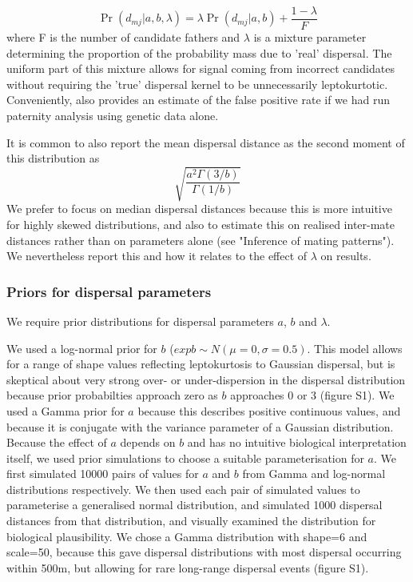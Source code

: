 \documentclass[10pt, a4paper, twocolumn]{article} %
\begin{document}
\begin{equation}\label{eqn:mixture_model}
\Pr(d_{mj} | a,b,\lambda) = \lambda \Pr(d_{mj}|a,b) + \frac{1-\lambda}{F}
\end{equation}
where F is the number of candidate fathers and $\lambda$ is a mixture parameter determining the proportion of the probability mass due to ’real’ dispersal. The uniform part of this mixture allows for signal coming from incorrect candidates without requiring the 'true' dispersal kernel to be unnecessarily leptokurtotic. Conveniently, also provides an estimate of the false positive rate if we had run paternity analysis using genetic data alone.

It is common to also report the mean dispersal distance as the second moment of this distribution as
\begin{equation}
\label{eqn:sd_GND}    
\sqrt{ \frac{ a^2 \Gamma(3/b) }{ \Gamma(1/b) } }
\end{equation}
We prefer to focus on median dispersal distances because this is more intuitive for highly skewed distributions, and also to estimate this on realised inter-mate distances rather than on parameters alone (see "Inference of mating patterns"). We nevertheless report this and how it relates to the effect of $\lambda$ on results.

\subsubsection{Priors for dispersal parameters}

We require prior distributions for dispersal parameters $a$, $b$ and $\lambda$.

We used a log-normal prior for $b$ ($exp{b} \sim N(\mu=0, \sigma = 0.5)$.
This model allows for a range of shape values reflecting leptokurtosis to Gaussian dispersal, but is skeptical about very strong over- or under-dispersion in the dispersal distribution because prior probabilties approach zero as $b$ approaches 0 or 3 (figure S1).
We used a Gamma prior for $a$ because this describes positive continuous values, and because it is conjugate with the variance parameter of a Gaussian distribution.
Because the effect of $a$ depends on $b$ and has no intuitive biological interpretation itself, we used prior simulations to choose a suitable parameterisation for $a$. We first simulated 10000 pairs of values for $a$ and $b$ from Gamma and log-normal distributions respectively. We then used each pair of simulated values to parameterise a generalised normal distribution, and simulated 1000 dispersal distances from that distribution, and visually examined the distribution for biological plausibility. We chose a Gamma distribution with shape=6 and scale=50, because this gave dispersal distributions with most dispersal occurring within 500m, but allowing for rare long-range dispersal events (figure S1).
\end{document}
